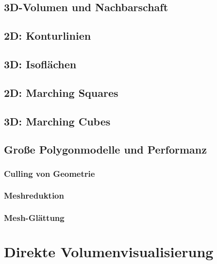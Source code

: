 \documentclass[a4paper, 11pt, accentcolor = tud3b]{tudreport}
\begin{document}
			\subsection{3D-Volumen und Nachbarschaft} %

			\subsection{2D: Konturlinien} %

			\subsection{3D: Isoflächen} %

			\subsection{2D: Marching Squares} %

			\subsection{3D: Marching Cubes} %

			\subsection{Große Polygonmodelle und Performanz} %

				\subsubsection{Culling von Geometrie} %

				\subsubsection{Meshreduktion} %

				\subsubsection{Mesh-Glättung} %

		\section{Direkte Volumenvisualisierung} %
\end{document}
